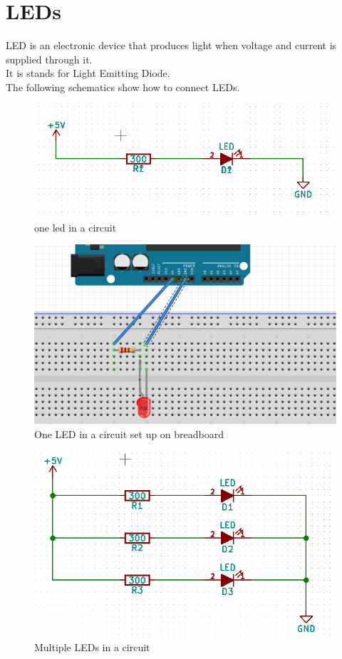 \documentclass[14pt]{memoir}
\begin{document}
\section*{LEDs}
LED is an electronic device that produces light when voltage and
current is supplied through it.
\\
It is stands for Light Emitting Diode.
\\
The following schematics show how to connect LEDs.
\begin{figure}[h]
    \includegraphics[width=\linewidth]{circuit_images/one_led.png}
    \caption{one led in a circuit}
\end{figure}
\begin{figure}[H]
    \includegraphics[width=0.7\linewidth]{./circuit_images/fritz_one_led.png}
    \caption{One LED in a circuit set up on breadboard}
\end{figure}

\begin{figure}[H]
    \includegraphics[width=0.7\linewidth]{circuit_images/multiple_leds.png}
    \caption{Multiple LEDs in a circuit}
\end{figure}
\end{document}
